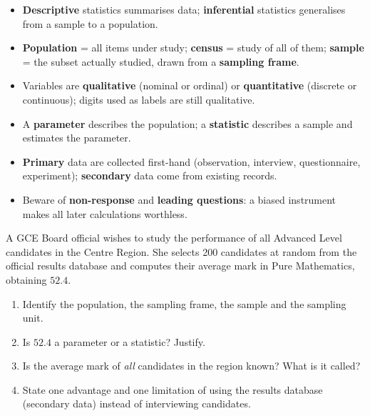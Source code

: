 \documentclass[11pt]{article}
\begin{document}
\begin{aretenir}
\begin{itemize}
\item \textbf{Descriptive} statistics summarises data; \textbf{inferential} statistics generalises from a sample to a population.
\item \textbf{Population} = all items under study; \textbf{census} = study of all of them; \textbf{sample} = the subset actually studied, drawn from a \textbf{sampling frame}.
\item Variables are \textbf{qualitative} (nominal or ordinal) or \textbf{quantitative} (discrete or continuous); digits used as labels are still qualitative.
\item A \textbf{parameter} describes the population; a \textbf{statistic} describes a sample and estimates the parameter.
\item \textbf{Primary} data are collected first-hand (observation, interview, questionnaire, experiment); \textbf{secondary} data come from existing records.
\item Beware of \textbf{non-response} and \textbf{leading questions}: a biased instrument makes all later calculations worthless.
\end{itemize}
\end{aretenir}

\begin{exercice}
A GCE Board official wishes to study the performance of all Advanced Level candidates in the Centre Region. She selects 200 candidates at random from the official results database and computes their average mark in Pure Mathematics, obtaining $52.4$.
\begin{enumerate}
\item Identify the population, the sampling frame, the sample and the sampling unit.
\item Is $52.4$ a parameter or a statistic? Justify.
\item Is the average mark of \emph{all} candidates in the region known? What is it called?
\item State one advantage and one limitation of using the results database (secondary data) instead of interviewing candidates.
\end{enumerate}
\end{exercice}
\end{document}
